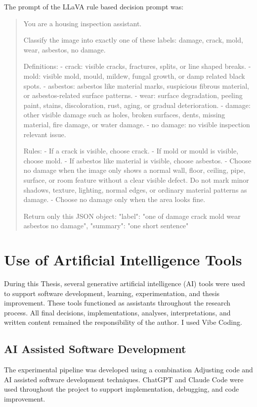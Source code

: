 The prompt of the LLaVA rule based decision prompt was:
\begin{quote}
You are a housing inspection assistant. 

Classify the image into exactly one of these labels:
damage, crack, mold, wear, asbestos, no damage.

Definitions:
- crack: visible cracks, fractures, splits, or line shaped breaks.
- mold: visible mold, mould, mildew, fungal growth, or damp related black spots.
- asbestos: asbestos like material marks, suspicious fibrous material, or asbestos-related surface patterns.
- wear: surface degradation, peeling paint, stains, discoloration, rust, aging, or gradual deterioration.
- damage: other visible damage such as holes, broken surfaces, dents, missing material, fire damage, or water damage.
- no damage: no visible inspection relevant issue.

Rules:
- If a crack is visible, choose crack.
- If mold or mould is visible, choose mold.
- If asbestos like material is visible, choose asbestos.
- Choose no damage when the image only shows a normal wall, floor, ceiling, pipe, surface, or room feature without a clear visible defect. Do not mark minor shadows, texture, lighting, normal edges, or ordinary material patterns as damage.
- Choose no damage only when the area looks fine.

Return only this JSON object:
{
  "label": "one of damage crack mold wear asbestos no damage",
  "summary": "one short sentence"
}
\end{quote}

\section{Use of Artificial Intelligence Tools}
\label{appendix:ai_usage}

During this Thesis, several generative artificial intelligence (AI) tools were used to support software development, learning, experimentation, and thesis improvement. These tools functioned as assistants throughout the research process. All final decisions, implementations, analyses, interpretations, and written content remained the responsibility of the author. I used Vibe Coding.

\subsection{AI Assisted Software Development}

The experimental pipeline was developed using a combination Adjusting code and AI assisted software development techniques. ChatGPT and Claude Code were used throughout the project to support implementation, debugging, and code improvement.

